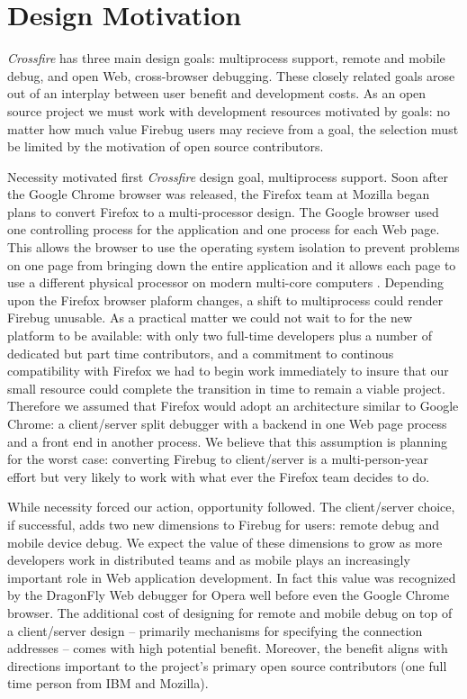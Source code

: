 \section{Design Motivation}
\textit{Crossfire} has three main design goals: multiprocess support, remote and
mobile debug, and open Web, cross-browser debugging.
These closely related goals arose out of an interplay between user benefit and development costs.
As an open source project we must work with development resources motivated by
goals: no matter how much value Firebug users may recieve from a goal, the
selection must be limited by the motivation of open source contributors.

Necessity motivated first \textit{Crossfire} design goal, multiprocess support.
Soon after the Google Chrome browser was released, the Firefox team at Mozilla
began plans to convert Firefox to a multi-processor design.  The Google browser
used one controlling process for the application and one process for each Web
page.  This allows the browser to use the operating system isolation to prevent
problems on one page from bringing down the entire application and it allows
each page to use a different physical processor on modern multi-core computers
\cite{GoogleChrome}.  Depending upon the Firefox browser plaform changes, a
shift to multiprocess could render Firebug unusable. As a practical matter we
could not wait to for the new platform to be available: with only two full-time
developers plus a number of dedicated but part time contributors, and a commitment to continous
compatibility with Firefox we had to begin work immediately to insure that our
small resource could complete the transition in time to remain a viable project.
Therefore we assumed that Firefox would adopt an architecture similar to Google
Chrome: a client/server split debugger with a backend in one Web page process
and a front end in another process.  We believe that this assumption is planning
for the worst case: converting Firebug to client/server is a multi-person-year
effort but very likely to work with what ever the Firefox team decides to do.

While necessity forced our action, opportunity followed. The client/server
choice, if successful, adds two new dimensions to Firebug for users: remote
debug and mobile device debug. We expect the value of these dimensions to grow
as more developers work in distributed teams and as mobile plays an increasingly
important role in Web application development.  In fact this value was
recognized by the DragonFly Web debugger for Opera well before even the Google
Chrome browser.   The additional cost of designing for remote and mobile debug
on top of a client/server design -- primarily mechanisms for specifying the
connection addresses -- comes with high potential benefit.  Moreover, the benefit
aligns with directions important to the project's primary open source
contributors (one full time person from IBM and Mozilla).

